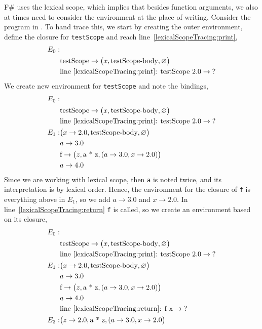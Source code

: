 F\# uses the lexical scope, which implies that besides function arguments, we also at times need to consider the environment at the place of writing. Consider the program in .
%
%
To hand trace this, we start by creating the outer environment, define the closure for \lstinline!testScope! and reach line~\ref{lexicalScopeTracing:print},
\begin{align*}
  E_0:&\\
      &\text{testScope} \rightarrow \big(x, \text{testScope-body}, \varnothing\big)\\
      & \text{line~\ref{lexicalScopeTracing:print}: testScope 2.0} \rightarrow \text{?}\\
\end{align*}
We create new environment for \lstinline!testScope! and note the bindings,
\begin{align*}
  E_0:&\\
      &\text{testScope} \rightarrow \big(x, \text{testScope-body}, \varnothing\big)\\
      & \text{line~\ref{lexicalScopeTracing:print}: testScope 2.0} \rightarrow \text{?}\\
  E_1: & \big(x\rightarrow 2.0, \text{testScope-body}, \varnothing\big)\\
      & a \rightarrow 3.0\\
      & \text{f} \rightarrow \big(z, \text{a * z}, (a \rightarrow 3.0, x\rightarrow 2.0)\big)\\
      & a \rightarrow 4.0
\end{align*}
Since we are working with lexical scope, then \lstinline!a! is noted twice, and its interpretation is by lexical order. Hence, the environment for the closure of \lstinline!f! is everything above in $E_1$, so we add $a \rightarrow 3.0$ and $x \rightarrow 2.0$. In line~\ref{lexicalScopeTracing:return} \lstinline!f! is called, so we create an environment based on its closure,
\begin{align*}
  E_0:&\\
      &\text{testScope} \rightarrow \big(x, \text{testScope-body}, \varnothing\big)\\
      & \text{line~\ref{lexicalScopeTracing:print}: testScope 2.0} \rightarrow \text{?}\\
  E_1: & \big(x\rightarrow 2.0, \text{testScope-body}, \varnothing\big)\\
      & a \rightarrow 3.0\\
      & \text{f} \rightarrow \big(z, \text{a * z}, (a \rightarrow 3.0, x\rightarrow 2.0)\big)\\
      & a \rightarrow 4.0 \\
      & \text{line~\ref{lexicalScopeTracing:return}: f x} \rightarrow \text{?}\\
  E_2: & \big(z \rightarrow 2.0, \text{a * z}, (a \rightarrow 3.0, x\rightarrow 2.0\big)\\
\end{align*}
